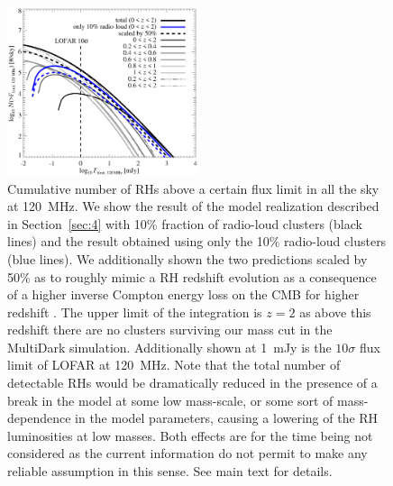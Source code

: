 \documentclass[traditabstract]{aa}
\begin{document}
\begin{figure}[hbt!]
\centering
\includegraphics[width=0.5\textwidth]{figures/RLF_LOFAR_flux.eps}
\caption{Cumulative number of RHs above a certain flux limit in all the sky at 120~MHz. We show the result of the model realization described in Section~\ref{sec:4} with 10\% fraction of radio-loud clusters (black lines) and the result obtained using only the 10\% radio-loud clusters (blue lines). We additionally shown the two predictions scaled by 50\% as to roughly mimic a RH redshift evolution as a consequence of a higher inverse Compton energy loss on the CMB for higher redshift \citep{2002A&A...396...83E}. The upper limit of the integration is $z = 2$ as above this redshift there are no clusters surviving our mass cut in the MultiDark simulation. Additionally shown at 1~mJy is the $10\sigma$ flux limit of LOFAR at 120~MHz. Note that the total number of detectable RHs would be dramatically reduced in the presence of a break in the model at some low mass-scale, or some sort of mass-dependence in the model parameters, causing a lowering of the RH luminosities at low masses. Both effects are for the time being not considered as the current information do not permit to make any reliable assumption in this sense. See main text for details.
}
\label{fig:RLF_120_flux}
\end{figure}
\end{document}
